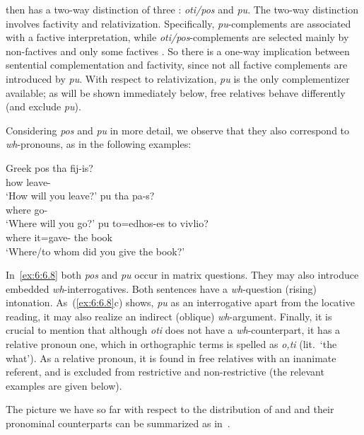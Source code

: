 \documentclass[output=paper]{langsci/langscibook}
\begin{document}
 then has a two-way distinction of three : \emph{oti/pos}
and \emph{pu}. The two-way distinction involves factivity and relativization.
Specifically, \emph{pu}{}-complements are associated with a factive
interpretation, while \emph{oti/pos}{}-comple\-ments are selected mainly by
non-factives and only some factives \parencite{Christidis1982,Roussou1994}. So
there is a one-way implication between sentential complementation and
factivity, since not all factive complements are introduced by \emph{pu}. With
respect to relativization, \emph{pu} is the only complementizer available; as
will be shown immediately below, free relatives behave differently (and exclude
\emph{pu}).

Considering \emph{pos} and \emph{pu} in more detail, we observe that they also
correspond to \emph{wh}-pronouns, as in the following examples:

\ea\label{ex:6:6.8}Greek
	\ea
		\gll pos  tha   fij-is?\\
			how \Fut{} leave-\Ssg{}\\
		\glt \enquote*{How will you leave?}
	\ex
		\gll pu  tha  pa-s?\\
			where  \Fut{} go-\Ssg{}\\
		\glt \enquote*{Where will you go?}
	\ex
		\gll pu  to=edhos-es to  vivlio?\\
			where  it=gave-\Ssg{}  the book\\
		\glt \enquote*{Where/to whom did you give the book?}
	\z
\z

In~\eqref{ex:6:6.8} both \emph{pos} and \emph{pu} occur in matrix questions. They may also
introduce embedded \emph{wh}-interrogatives. Both sentences have a \emph{wh}-question
(rising) intonation. As~(\ref{ex:6:6.8}c) shows, \emph{pu} as an interrogative apart from
the locative reading, it may also realize an indirect (oblique) \emph{wh}-argument.
Finally, it is crucial to mention that although \emph{oti} does not have a
\emph{wh}-counterpart, it has a relative pronoun one, which in orthographic terms is
spelled as \emph{o,ti} (lit.\ ‘the what’). As a relative pronoun, it is found in
free relatives with an inanimate referent, and is excluded from restrictive and
non-restrictive  (the relevant examples are given below).

The picture we have so far with respect to the distribution of  and
  and their pronominal counterparts can be
summarized as in~.
\end{document}
